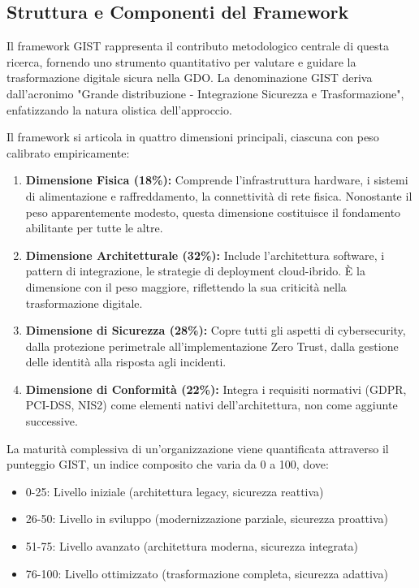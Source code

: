 \subsection{\texorpdfstring{\textbf{Struttura e Componenti del Framework}}{5.3.1 - Struttura e Componenti del Framework}}
\label{subsec:5.3.1}

Il framework GIST rappresenta il contributo metodologico centrale di questa ricerca, fornendo uno strumento quantitativo per valutare e guidare la trasformazione digitale sicura nella GDO. La denominazione GIST deriva dall'acronimo "Grande distribuzione - Integrazione Sicurezza e Trasformazione", enfatizzando la natura olistica dell'approccio.

Il framework si articola in quattro dimensioni principali, ciascuna con peso calibrato empiricamente:

\begin{enumerate}
\item \textbf{Dimensione Fisica (18\%):} Comprende l'infrastruttura hardware, i sistemi di alimentazione e raffreddamento, la connettività di rete fisica. Nonostante il peso apparentemente modesto, questa dimensione costituisce il fondamento abilitante per tutte le altre.

\item \textbf{Dimensione Architetturale (32\%):} Include l'architettura software, i pattern di integrazione, le strategie di deployment cloud-ibrido. È la dimensione con il peso maggiore, riflettendo la sua criticità nella trasformazione digitale.

\item \textbf{Dimensione di Sicurezza (28\%):} Copre tutti gli aspetti di cybersecurity, dalla protezione perimetrale all'implementazione Zero Trust, dalla gestione delle identità alla risposta agli incidenti.

\item \textbf{Dimensione di Conformità (22\%):} Integra i requisiti normativi (GDPR, PCI-DSS, NIS2) come elementi nativi dell'architettura, non come aggiunte successive.
\end{enumerate}

La maturità complessiva di un'organizzazione viene quantificata attraverso il punteggio GIST, un indice composito che varia da 0 a 100, dove:
\begin{itemize}
\item 0-25: Livello iniziale (architettura legacy, sicurezza reattiva)
\item 26-50: Livello in sviluppo (modernizzazione parziale, sicurezza proattiva)
\item 51-75: Livello avanzato (architettura moderna, sicurezza integrata)
\item 76-100: Livello ottimizzato (trasformazione completa, sicurezza adattiva)
\end{itemize}

